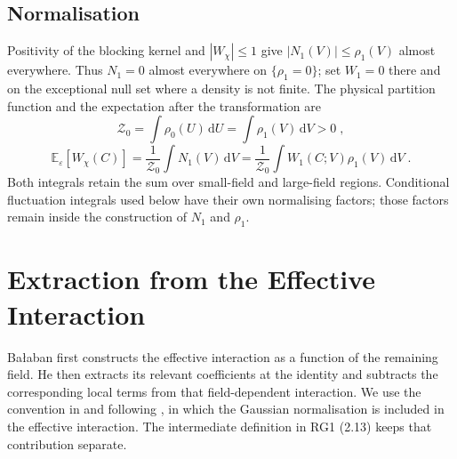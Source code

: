 \documentclass[11pt]{article}
\newcommand{\dd}{\mathrm{d}}
\begin{document}
\subsection{Normalisation}
Positivity of the blocking kernel and $|W_\chi|\leq1$ give $|N_1(V)|\leq\rho_1(V)$ almost everywhere. Thus $N_1=0$ almost everywhere on $\{\rho_1=0\}$; set $W_1=0$ there and on the exceptional null set where a density is not finite.
The physical partition function and the expectation after the transformation are
\begin{equation}\label{eq:one-step-physical-partition}
    \mathcal Z_0=\int\rho_0(U)\,\dd U
        =\int\rho_1(V)\,\dd V>0\;,
\end{equation}
\begin{equation}
    \mathbb E_{\varepsilon}[W_\chi(C)]
        =\frac{1}{\mathcal Z_0}\int N_1(V)\,\dd V
        =\frac{1}{\mathcal Z_0}\int W_1(C;V)\rho_1(V)\,\dd V\;.
\end{equation}
Both integrals retain the sum over small-field and large-field regions. Conditional fluctuation integrals used below have their own normalising factors; those factors remain inside the construction of $N_1$ and $\rho_1$.

\section{Extraction from the Effective Interaction}
\label{sec:extraction-procedure}

Ba{\l}aban first constructs the effective interaction as a function of the remaining field. He then extracts its relevant coefficients at the identity and subtracts the corresponding local terms from that field-dependent interaction. We use the convention in \cite[(1.6)--(1.7)]{BalabanRG1} and following \cite[(1.30)]{BalabanCRE}, in which the Gaussian normalisation is included in the effective interaction. The intermediate definition in RG1 (2.13) keeps that contribution separate.
\end{document}
